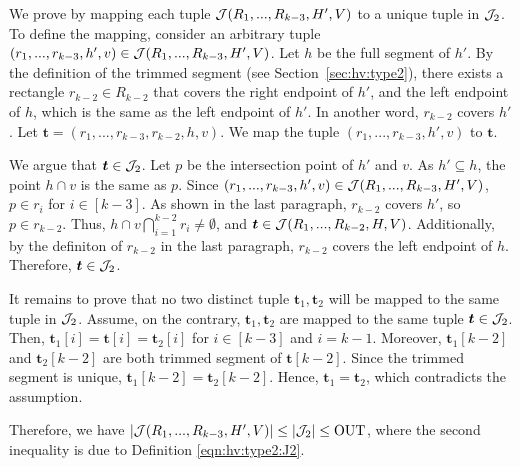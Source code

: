 We prove by mapping each tuple $\mathcal{J}(R_1,...,R_{k-3},H',V)$ to a unique tuple in $\mathcal{J}_2$. 
To define the mapping, consider an arbitrary tuple $(r_1,...,r_{k-3}, h', v) \in \mathcal{J}(R_1,...,R_{k-3},H',V)$. Let $h$ be the full segment of $h'$. By the definition of the trimmed segment (see Section~\ref{sec:hv:type2}), there exists a rectangle $r_{k-2}\in R_{k-2}$ that covers the right endpoint of $h'$, and the left endpoint of $h$, which is the same as the left endpoint of $h'$. In another word, $r_{k-2}$ covers $h'$. Let $\bm{t} = (r_1,...,r_{k-3}, r_{k-2},h,v)$. We map the tuple $(r_1,...,r_{k-3}, h', v)$ to $\bm{t}$. 

\vgap 

We argue that $\textrm{\boldmath${t}$}\in \mathcal{J}_2$. Let $p$ be the intersection point of $h'$ and $v$. As $h' \subseteq h$, the point $h\cap v$ is the same as $p$.
Since $(r_1,...,r_{k-3}, h', v) \in \mathcal{J}(R_1,...,R_{k-3},H',V)$, $p \in r_i$ for $i \in [k-3]$. As shown in the last paragraph, $r_{k-2}$ covers $h'$, so $p \in r_{k-2}$. Thus, $h \cap v \bigcap_{i = 1}^{k-2}r_i \neq \emptyset$, and $\textrm{\boldmath${t}$} \in \mathcal{J}(R_1,...,R_{k-2},H,V)$.
 Additionally, by the definiton of $r_{k-2}$ in the last paragraph, $r_{k-2}$ covers the left endpoint of $h$. Therefore, $\textrm{\boldmath${t}$} \in \mathcal{J}_2$.

\vgap

It remains to prove that no two distinct tuple $\bm{t}_1, \bm{t}_2$ will be mapped to the same tuple in $\mathcal{J}_2$. Assume, on the contrary, $\bm{t}_1, \bm{t}_2$ are mapped to the same tuple $\textrm{\boldmath${t}$} \in \mathcal{J}_2$. Then, $\bm{t}_1[i] = \bm{t}[i] = \bm{t}_2[i]$ for $i\in [k-3]$ and $i = k-1$. Moreover, $\bm{t}_1[k-2]$ and $\bm{t}_2[k-2]$ are both trimmed segment of $\bm{t}[k-2]$. Since the trimmed segment is unique, $\bm{t}_1[k-2] = \bm{t}_2[k-2]$. Hence, $\bm{t}_1 = \bm{t}_2$, which contradicts the assumption.  

\vgap

Therefore, we have $|\mathcal{J}(R_1,...,R_{k-3},H',V)| \le |\mathcal{J}_2| \le \mathrm{OUT}$, where the second inequality is due to Definition \eqref{eqn:hv:type2:J2}. 